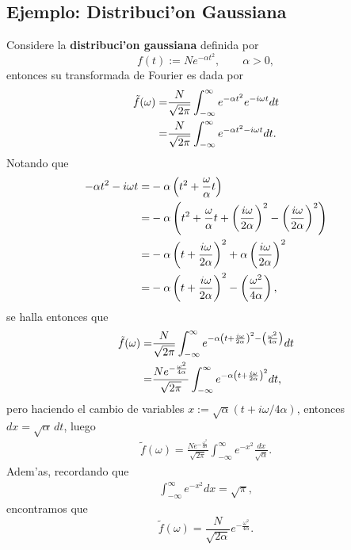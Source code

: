 \subsection{Ejemplo: Distribuci'on Gaussiana}
Considere la \textbf{distribuci'on gaussiana} definida por
\begin{equation}\label{fgauss}
f(t):=N e^{-\alpha t^2}, \qquad \alpha>0,
\end{equation}
entonces su transformada de Fourier es dada por
\begin{align}
\tilde{f}(\omega)=&\frac{N}{\sqrt{2\pi}}\int_{-\infty}^{\infty}e^{-\alpha t^2} e^{-i \omega t}dt\notag \\
=&\frac{N}{\sqrt{2\pi}}\int_{-\infty}^{\infty}e^{-\alpha t^2-i\omega t} dt.
\end{align}
Notando que
\begin{align}
-\alpha t^2-i\omega t=&-\alpha \left(t^2+\frac{\omega}{\alpha}t\right) \notag \\
=&-\alpha\left(t^2+\frac{\omega}{\alpha}t+\left(\frac{i\omega}{2\alpha}\right)^2-\left(\frac{i\omega}{2\alpha}\right)^2\right) \notag \\
=&-\alpha \left( t+\frac{i\omega}{2\alpha} \right)^2+\alpha\left(\frac{i\omega}{2\alpha}\right)^2\notag \\
=&-\alpha \left( t+\frac{i\omega}{2\alpha} \right)^2-\left(\frac{\omega^2}{4\alpha}\right),
\end{align}
se halla entonces que
\begin{align}
\tilde{f}(\omega)=&\frac{N}{\sqrt{2\pi}}\int_{-\infty}^{\infty}e^{-\alpha \left( t+\frac{i\omega}{2\alpha} \right)^2-\left(\frac{\omega^2}{4\alpha}\right)}dt\notag\\
=&\frac{N e^{-\frac{\omega^2}{4\alpha}}}{\sqrt{2\pi}}\int_{-\infty}^{\infty}e^{-\alpha \left( t+\frac{i\omega}{2\alpha} \right)^2}dt,
\end{align}
pero haciendo el cambio de variables $x:=\sqrt{\alpha}(t+i\omega/4\alpha)$, entonces $dx=\sqrt{\alpha}\,dt$, luego
\begin{align}
\tilde{f}(\omega)=\frac{N e^{-\frac{\omega^2}{4\alpha}}}{\sqrt{2\pi}}\int_{-\infty}^{\infty}e^{-x^2} \frac{dx}{\sqrt{\alpha}}.
\end{align}
Adem'as, recordando que
\begin{align}
\int_{-\infty}^{\infty}e^{-x^2}dx=\sqrt{\pi},
\end{align}
encontramos que
\begin{equation}\label{Tfgauss}
\tilde{f}(\omega)=\frac{N}{\sqrt{2\alpha}}e^{-\frac{\omega^2}{4\alpha}}.
\end{equation}
